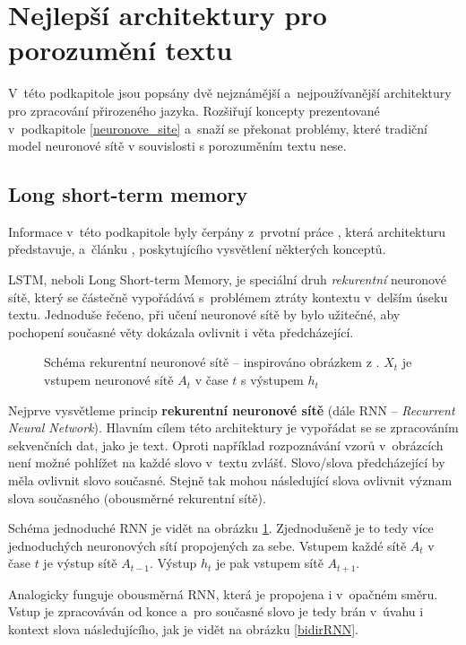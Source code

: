\section{Nejlepší architektury pro porozumění textu}
V~této podkapitole jsou popsány dvě nejznámější a~nejpoužívanější architektury pro zpracování přirozeného jazyka. Rozšiřují koncepty prezentované v~podkapitole \ref{neuronove_site} a~snaží se překonat problémy, které tradiční model neuronové sítě v souvislosti s porozuměním textu nese.\par

\subsection{Long short-term memory}
\label{lstm}
Informace v~této podkapitole byly čerpány z~prvotní práce \cite{LSTM}, která architekturu představuje,  a~článku \cite{understandingLSTM}, poskytujícího vysvětlení některých konceptů.\par
LSTM, neboli Long Short-term Memory, je speciální druh \emph{rekurentní} neuronové sítě, který se částečně vypořádává s~problémem ztráty kontextu v~delším úseku textu. Jednoduše řečeno, při učení neuronové sítě by bylo užitečné, aby pochopení současné věty dokázala ovlivnit i věta předcházející.\par

\begin{figure}[hbt]
    \centering
	\caption{Schéma rekurentní neuronové sítě -- inspirováno obrázkem z \cite{understandingLSTM}. $X_t$ je vstupem neuronové sítě $A_t$ v čase $t$ s výstupem $h_t$}
	\label{RNN}
\end{figure}

Nejprve vysvětleme princip \textbf{rekurentní neuronové sítě} (dále RNN -- \textit{Recurrent Neural Network}).
Hlavním cílem této architektury je vypořádat se se zpracováním sekvenčních dat, jako je text. Oproti například rozpoznávání vzorů v~obrázcích není možné pohlížet na každé slovo v~textu zvlášť. Slovo/slova předcházející by měla ovlivnit slovo současné. Stejně tak mohou následující slova ovlivnit význam slova současného (obousměrné rekurentní sítě).\par
Schéma jednoduché RNN je vidět na obrázku \ref{RNN}. Zjednodušeně je to tedy více jednoduchých neuronových sítí propojených za sebe. Vstupem každé sítě $A_t$ v čase $t$ je výstup sítě $A_{t-1}$. Výstup $h_t$ je pak vstupem sítě $A_{t+1}$.\par
Analogicky funguje obousměrná RNN, která je propojena i v~opačném směru. Vstup je zpracováván od konce a~pro současné slovo je tedy brán v~úvahu i kontext slova následujícího, jak je vidět na obrázku \ref{bidirRNN}.\par

